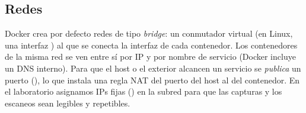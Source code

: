 \subsection{Redes}

Docker crea por defecto redes de tipo \emph{bridge}: un conmutador virtual (en Linux, una interfaz ) al que se conecta la interfaz  de cada contenedor. Los contenedores de la misma red se ven entre sí por IP y por nombre de servicio (Docker incluye un DNS interno). Para que el host o el exterior alcancen un servicio se \emph{publica} un puerto (), lo que instala una regla NAT del puerto del host al del contenedor. En el laboratorio asignamos IPs fijas () en la subred  para que las capturas y los escaneos sean legibles y repetibles.

